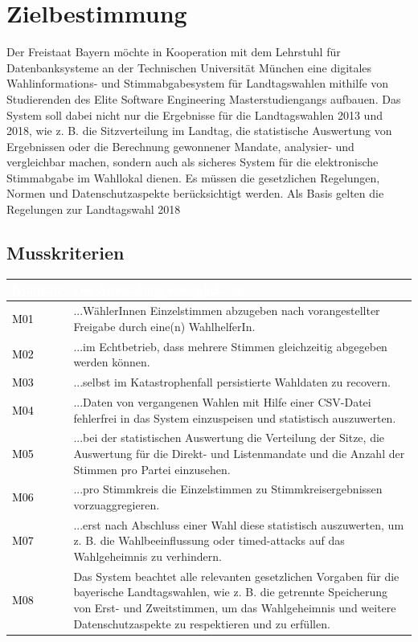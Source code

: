 \documentclass[a4paper,12pt]{article}
\newcommand\addrow[2]{\textcolor{black}{#1} &#2\\ \hline}
\newcommand\addheading[2]{\rowcolor{TUMBlue}\textcolor{white}{#1} & \textcolor{white}{#2}\\ \hline}
\newcommand\tabularhead{\begin{tabular}{|b|p{13cm}|}
\hline
}
\newenvironment{usecase}{\tabularhead}
{\hline\end{tabular}}
\begin{document}
 \setcounter{page}{2}

 \tableofcontents          %
 \clearpage
 
\section{Zielbestimmung}
Der Freistaat Bayern möchte in Kooperation mit dem Lehrstuhl für 
Datenbanksysteme an der Technischen Universität München eine digitales 
Wahlinformations- und Stimmabgabesystem für Landtagswahlen mithilfe von 
Studierenden des Elite Software Engineering Masterstudiengangs aufbauen.
%
Das System soll dabei nicht nur die Ergebnisse für die Landtagswahlen 
2013 und 2018, wie z. B. die Sitzverteilung im Landtag, die statistische Auswertung von Ergebnissen oder die Berechnung gewonnener
Mandate, analysier- und vergleichbar machen, sondern auch als sicheres System für die elektronische 
Stimmabgabe im Wahllokal dienen. 
%
Es müssen die gesetzlichen Regelungen, Normen und Datenschutzaspekte
berücksichtigt werden. Als Basis gelten die Regelungen zur
Landtagswahl 2018


\subsection{Musskriterien}
\begin{usecase}
	\addheading{Nummer}{Die Anwendung ermöglicht es...} 
      \addrow{M01}{...WählerInnen Einzelstimmen abzugeben nach vorangestellter Freigabe durch eine(n) WahlhelferIn.}
      \addrow{M02}{...im Echtbetrieb, dass mehrere Stimmen gleichzeitig abgegeben werden können.}
      \addrow{M03}{...selbst im Katastrophenfall persistierte Wahldaten zu recovern.}
	\addrow{M04}{...Daten von vergangenen Wahlen mit Hilfe einer CSV-Datei fehlerfrei in das System einzuspeisen und statistisch auszuwerten.}
	\addrow{M05}{...bei der statistischen Auswertung die Verteilung der Sitze, die Auswertung für die Direkt- und Listenmandate und die Anzahl der Stimmen pro Partei einzusehen.}
	\addrow{M06}{...pro Stimmkreis die Einzelstimmen zu Stimmkreisergebnissen vorzuaggregieren.}
	\addrow{M07}{...erst nach Abschluss einer Wahl diese statistisch auszuwerten, um z. B. die Wahlbeeinflussung oder timed-attacks auf das Wahlgeheimnis zu verhindern.}
      \addrow{M08}{Das System beachtet alle relevanten gesetzlichen Vorgaben für die bayerische Landtagswahlen, wie z. B. die getrennte Speicherung von Erst- und Zweitstimmen, um das Wahlgeheimnis und weitere Datenschutzaspekte zu respektieren und zu erfüllen.}
\end{usecase}
\end{document}
